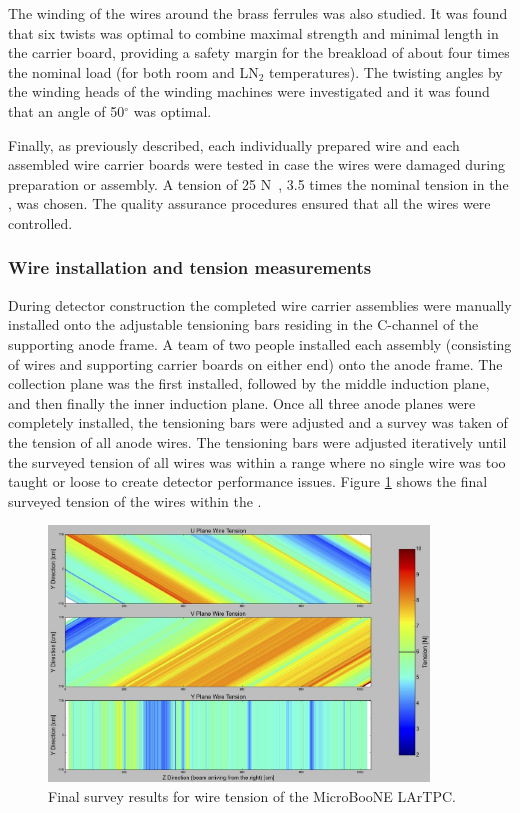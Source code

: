 The winding of the wires around the brass ferrules was also studied. It was found that six twists was optimal to combine maximal strength and minimal length in the carrier board, providing a safety margin for the breakload of about four times the nominal load (for both room and LN$_{2}$ temperatures). The twisting angles by the winding heads of the winding machines were investigated and it was found that an angle of 50$^{\circ}$ was optimal.

Finally, as previously described, each individually prepared wire and each assembled wire carrier boards were tested in case the wires were damaged during preparation or assembly.  A tension of 25 N~, 3.5 times the nominal tension in the \lartpc, was chosen. The quality assurance procedures ensured that all the wires were controlled.


\subsubsection{Wire installation and tension measurements}
During detector construction the completed wire carrier assemblies were manually installed onto the adjustable tensioning bars residing in the C-channel of the supporting anode frame.  A team of two people installed each assembly (consisting of wires and supporting carrier boards on either end) onto the anode frame.  The collection plane was the first installed, followed by the middle induction plane, and then finally the inner induction plane.  Once all three anode planes were completely installed, the tensioning bars were adjusted and a survey was taken of the tension of all anode wires.  The tensioning bars were adjusted iteratively until the surveyed tension of all wires was within a range where no single wire was too taught or loose to create detector performance issues.  Figure \ref{fig:heatmap} shows the final surveyed tension of the wires within the \lartpc.

\begin{figure}[htb]
\centering
\includegraphics[width=0.9\textwidth]{figures/tension_heatmap.jpg}
\caption{Final survey results for wire tension of the MicroBooNE LArTPC.}
\label{fig:heatmap}
\end{figure} 




